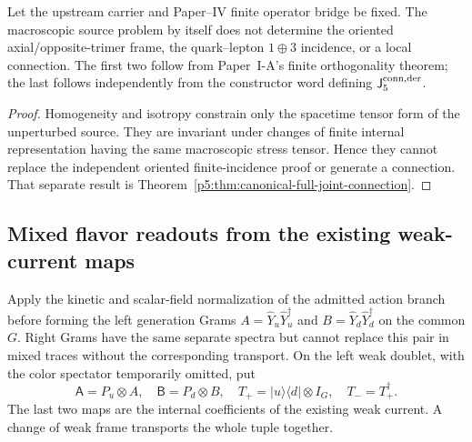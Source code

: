 \documentclass[12pt,a4paper]{article}
\begin{document}
\begin{proposition}
\label{p5:prop:visible-source-residue-forces-sector-problem}
Let the upstream carrier and Paper--IV finite operator bridge be fixed.  The
macroscopic source problem by itself does not determine the oriented
axial/opposite-trimer frame, the quark--lepton \(1\oplus3\) incidence, or a
local connection.  The first two follow from Paper~I-A's finite orthogonality
theorem; the last follows independently from the constructor word defining
\(\mathsf J_5^{\rm conn,der}\).
\end{proposition}

\begin{proof}
Homogeneity and isotropy constrain only the spacetime tensor form of the
unperturbed source.  They are invariant under changes of finite internal
representation having the same macroscopic stress tensor.  Hence they cannot
replace the independent oriented finite-incidence proof or generate a
connection.  That separate result is
Theorem~\ref{p5:thm:canonical-full-joint-connection}.
\end{proof}

\subsection{Mixed flavor readouts from the existing weak-current maps}
\label{p5:sec:v199-weak-current-readouts}
Apply the kinetic and scalar-field normalization of the admitted action
branch before forming the left generation Grams
\(A=\widehat Y_u\widehat Y_u^\dagger\) and
\(B=\widehat Y_d\widehat Y_d^\dagger\) on the common \(G\).
Right Grams have the same separate spectra but cannot replace this pair in
mixed traces without the corresponding transport.  On the left weak doublet,
with the color spectator temporarily omitted, put
\[
 \mathsf A=P_u\otimes A,\quad \mathsf B=P_d\otimes B,\quad
 T_+=|u\rangle\langle d|\otimes I_G,\quad T_-=T_+^\dagger.
\]
The last two maps are the internal coefficients of the existing weak current.
A change of weak frame transports the whole tuple together.
\end{document}
